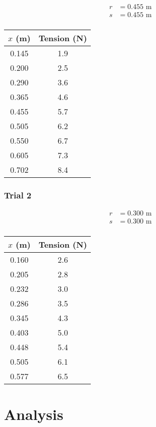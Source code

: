 \documentclass[a4paper,11pt]{article}
\begin{document}
$$
\begin{aligned}
r & = 0.455\mbox{ m} \\
s & = 0.455\mbox{ m} \\
\end{aligned}
$$

\begin{center}
\begin{tabular}{c|c}
$x$ (m) & Tension (N) \\
\hline
0.145 & 1.9 \\
0.200 & 2.5 \\
0.290 & 3.6 \\
0.365 & 4.6 \\
0.455 & 5.7 \\
0.505 & 6.2 \\
0.550 & 6.7 \\
0.605 & 7.3 \\
0.702 & 8.4 \\
\end{tabular}
\end{center}


\subsubsection{Trial 2}

$$
\begin{aligned}
r & = 0.300\mbox{ m} \\
s & = 0.300\mbox{ m} \\
\end{aligned}
$$

\begin{center}
\begin{tabular}{c|c}
$x$ (m) & Tension (N) \\
\hline
0.160 & 2.6 \\
0.205 & 2.8 \\
0.232 & 3.0 \\
0.286 & 3.5 \\
0.345 & 4.3 \\
0.403 & 5.0 \\
0.448 & 5.4 \\
0.505 & 6.1 \\
0.577 & 6.5 \\
\end{tabular}
\end{center}


\section{Analysis}
\end{document}
